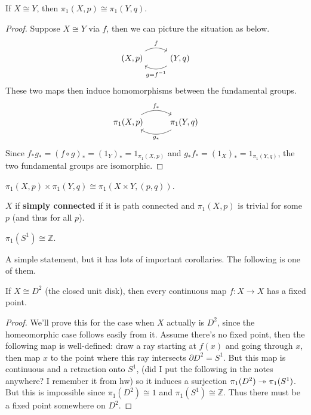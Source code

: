 \documentclass[twoside,10pt]{report}
\begin{document}
\begin{thrm}[]
	If $X \cong Y$, then $\pi_1(X,p) \cong \pi_1(Y,q)$.
\end{thrm}
\begin{proof}
	Suppose $X \cong Y$ via $f$, then we can picture the situation as below.
	\[
	\begin{tikzcd}
		(X,p)\arrow[r,"f",bend left]&(Y,q)\arrow[l,"g=f^{-1}",bend left]
	\end{tikzcd}
	\] 
	These two maps then induce homomorphisms between the fundamental groups.
	\[
        \begin{tikzcd}
                \pi_1(X,p)\arrow[r,"f_{*}",bend left]&\pi_1(Y,q)\arrow[l,"g_{*}",bend left]
        \end{tikzcd}
        \]
	Since $f_{*}g_{*}=(f\circ g)_{*}=(1_{Y})_{*}=1_{\pi_1(X,p)}$ and $g_{*}f_{*}=(1_{X})_{*}=1_{\pi_1(Y,q)}$, the two fundamental groups are isomorphic.
\end{proof}

\begin{prop}
	$\pi_1(X,p) \times \pi_1(Y,q) \cong \pi_1(X\times Y,(p,q))$.
\end{prop}

\begin{defn}[]
	$X$ if \textbf{simply connected} if it is path connected and $\pi_1(X,p)$ is trivial for some $p$ (and thus for all $p$).
\end{defn}

\begin{thrm}[]
	$\pi_1(S^{1})\cong \mathbb{Z}$.
\end{thrm}
A simple statement, but it has lots of important corollaries. The following is one of them.

\begin{thrm}
	If $X \cong D^{2}$ (the closed unit disk), then every continuous map $f:X\to X$ has a fixed point.
\end{thrm}
\begin{proof}
	We'll prove this for the case when $X$ actually is $D^{2}$, since the homeomorphic case follows easily from it. Assume there's no fixed point, then the following map is well-defined: draw a ray starting at $f(x)$ and going through $x$, then map $x$ to the point where this ray intersects $\partial D^2 = S^{1}$. But this map is continuous and a retraction onto $S^{1}$, {\color{red}(did I put the following in the notes anywhere? I remember it from hw)} so it induces a surjection $\pi_1(D^{2}) \twoheadrightarrow \pi_1(S^{1})$. But this is impossible since $\pi_1(D^{2}) \cong 1$ and $\pi_1(S^{1}) \cong \mathbb{Z}$. Thus there must be a fixed point somewhere on $D^{2}$.
\end{proof}
\end{document}
